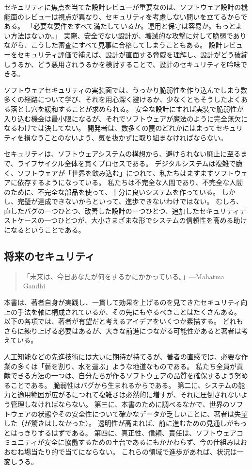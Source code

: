 \documentclass[uplatex]{jsarticle}
\begin{document}
セキュリティに焦点を当てた設計レビューが重要なのは、ソフトウェア設計の機能面のレビューは視点が異なり、セキュリティを考慮しない問いを立てるからである。
「必要な要件をすべて満たしているか。運用と保守は容易か。もっとよい方法はないか。」
実際、安全でない設計が、壊滅的な攻撃に対して脆弱でありながら、こうした審査にすべて見事に合格してしまうこともある。
設計レビューをセキュリティ評価で補えば、設計が直面する脅威を理解し、設計がどう破綻しうるか、どう悪用されうるかを検討することで、設計のセキュリティを吟味できる。

ソフトウェアセキュリティの実装面では、うっかり脆弱性を作り込んでしまう数多くの経路について学び、それを用心深く避けるか、少なくともそうしたよくある落とし穴を緩和することが求められる。
安全な設計にすれば実装で脆弱性が入り込む機会は最小限になるが、それでソフトウェアが魔法のように完全無欠になるわけでは決してない。
開発者は、数多くの罠のどれかにはまってセキュリティを損なうことのないよう、気を抜かずに取り組まなければならない。

セキュリティは、ソフトウェアシステムの構想から、避けられない廃止に至るまで、ライフサイクル全体を貫くプロセスである。
デジタルシステムは複雑で脆く、ソフトウェアが「世界を飲み込む」につれて、私たちはますますソフトウェアに依存するようになっている。
私たちは不完全な人間であり、不完全な人間のために、不完全な部品を使って、十分に良いシステムを作っている。
しかし、完璧が達成できないからといって、進歩できないわけではない。
むしろ、直したバグの一つひとつ、改善した設計の一つひとつ、追加したセキュリティテストケースの一つひとつが、大小さまざまな形でシステムの信頼性を高める助けになるということである。

\subsection{将来のセキュリティ}

\begin{quote}
「未来は、今日あなたが何をするかにかかっている。」---Mahatma Gandhi
\end{quote}

本書は、著者自身が実践し、一貫して効果を上げるのを見てきたセキュリティ向上の手法を軸に構成されているが、その先にもやるべきことはたくさんある。
以下の各項では、著者が有望だと考えるアイデアをいくつか素描する。
どれもさらに練り上げる必要はあるが、大きな前進につながる可能性があると著者は考えている。

人工知能などの先進技術には大いに期待が持てるが、著者の直感では、必要な作業の多くは「薪を割り、水を運ぶ」ような地道なものである。
私たち全員が貢献できる方法の一つは、自分たちが作るソフトウェアの品質を確保するよう努めることである。
脆弱性はバグから生まれるからである。
第二に、システムの能力と適用範囲が広がるにつれて複雑さは必然的に増すが、それに圧倒されないよう管理しなければならない。
第三に、本書のために調べるなかで、世界のソフトウェアの状態やその安全性について確かなデータが乏しいことに、著者は失望した（が驚きはしなかった）。
透明性が高まれば、前に進むための見通しがもっとはっきりするはずである。
第四に、真正性、信頼、責任は、ソフトウェアコミュニティが安全に協働するための土台であるにもかかわらず、今の仕組みはおおむね場当たり的で当てにならない。
これらの領域で進歩があれば、状況は一変しうる。
\end{document}
